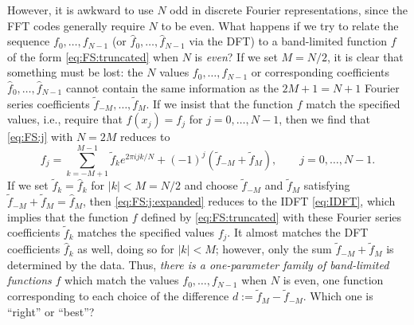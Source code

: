 \documentclass[12pt]{article}
\newcommand{\abs}[1]{\left|{#1}\right|}
\newcommand{\fc}[1]{\widetilde{#1}} %
\newcommand{\dfc}[1]{\widehat{#1}}  %
\begin{document}
However, it is awkward to use $N$ odd in discrete Fourier representations,
since the FFT codes generally require $N$ to be even.  What happens if we try
to relate the sequence $f_0,\dots,f_{N-1}$ (or $\dfc{f}_0,\dots,\dfc{f}_{N-1}$
via the DFT) to a band-limited function $f$ of the form
\eqref{eq:FS:truncated} when $N$ is \emph{even}?  If we set $M=N/2$, it is
clear that something must be lost: the $N$ values $f_0,\dots,f_{N-1}$ or
corresponding coefficients $\dfc{f}_0,\dots,\dfc{f}_{N-1}$ cannot contain the
same information as the $2M+1=N+1$ Fourier series coefficients
$\fc{f}_{-M},\dots,\fc{f}_{M}$.  If we insist that the function $f$ match the
specified values, i.e., require that $f(x_j) = f_j$ for $j=0,\dots,N-1$, then
we find that \eqref{eq:FS:j} with $N=2M$ reduces to
\begin{equation}
   f_j = \sum_{k=-M+1}^{M-1} \fc{f}_k e^{2\pi ijk/N} 
       + (-1)^j\left(\fc{f}_{-M} + \fc{f}_{M}\right),
\qquad j=0,\dots,N-1 .
\label{eq:FS:j:expanded}
\end{equation}
If we set $\fc{f}_k=\dfc{f}_k$ for $\abs{k}<M=N/2$ and choose $\fc{f}_{-M}$
and $\fc{f}_{M}$ satisfying $\fc{f}_{-M}+\fc{f}_{M}=\dfc{f}_{M}$, then
\eqref{eq:FS:j:expanded} reduces to the IDFT \eqref{eq:IDFT}, which implies
that the function $f$ defined by \eqref{eq:FS:truncated} with these Fourier
series coefficients $\fc{f}_k$ matches the specified values $f_j$.  It almost
matches the DFT coefficients $\dfc{f}_k$ as well, doing so for $\abs{k}<M$;
however, only the sum $\fc{f}_{-M} + \fc{f}_{M}$ is determined by the
data.  Thus, \emph{there is a one-parameter family of band-limited functions}
$f$ which match the values $f_0,\dots,f_{N-1}$ when $N$ is even, one function
corresponding to each choice of the difference $d:=\fc{f}_{M} - \fc{f}_{-M}$.
Which one is ``right'' or ``best''?
\end{document}
